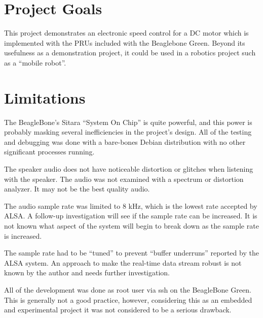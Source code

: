
\section{Project Goals}

This project demonstrates an electronic speed control for a DC motor which is implemented with the PRUs included with the Beaglebone Green.  Beyond its usefulness as a demonstration project, it could be used in a robotics project such as a ``mobile robot''.


\section{Limitations}

The BeagleBone's Sitara ``System On Chip'' is quite powerful, and this power is probably masking several inefficiencies in the project's design.  All of the testing and debugging was done with a bare-bones Debian distribution with no other significant processes running.

The speaker audio does not have noticeable distortion or glitches when listening with the speaker.  The audio was not examined with a spectrum or distortion analyzer.  It may not be the best quality audio.

The audio sample rate was limited to 8 kHz, which is the lowest rate accepted by ALSA.  A follow-up investigation will see if the sample rate can be increased.  It is not known what aspect of the system will begin to break down as the sample rate is increased.

The sample rate had to be ``tuned'' to prevent ``buffer underruns'' reported by the ALSA system.  An approach to make the real-time data stream robust is not known by the author and needs further investigation.

All of the development was done as root user via ssh on the BeagleBone Green.  This is generally not a good practice, however, considering this as an embedded and experimental project it was not considered to be a serious drawback.


